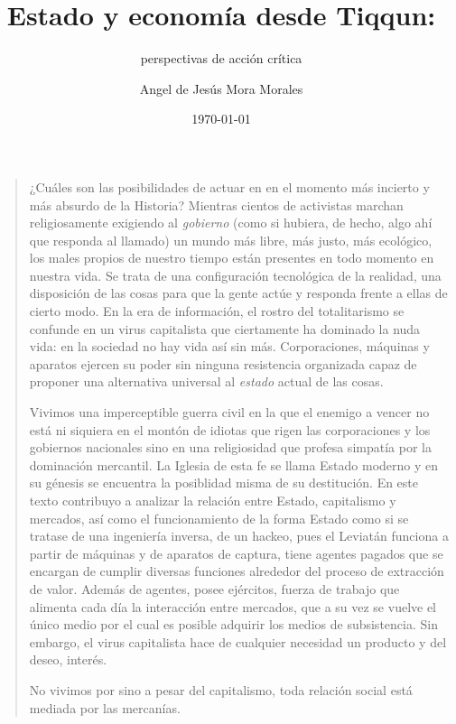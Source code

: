 \documentclass{scrbook}
\title{Estado y economía desde Tiqqun:}
\subtitle{perspectivas de acción crítica}
\author{Angel de Jesús Mora Morales}
\date{\today}
\begin{document}
\frontmatter
\maketitle


\begin{quotation}
    ¿Cuáles son las posibilidades de actuar en en el momento más incierto y más absurdo de la Historia? Mientras cientos de activistas marchan religiosamente exigiendo al \emph{gobierno} (como si hubiera, de hecho, algo ahí que responda al llamado) un mundo más libre, más justo, más ecológico, los males propios de nuestro tiempo están presentes en todo momento en nuestra vida. Se trata de una configuración tecnológica de la realidad, una disposición de las cosas para que la gente actúe y responda frente a ellas de cierto modo. En la era de información, el rostro del totalitarismo se confunde en un virus capitalista que ciertamente ha dominado la nuda vida: en la sociedad no hay vida así sin más. Corporaciones, máquinas y aparatos ejercen su poder sin ninguna resistencia organizada capaz de proponer una alternativa universal al \emph{estado} actual de las cosas.

    Vivimos una imperceptible guerra civil en la que el enemigo a vencer no está ni siquiera en el montón de idiotas que rigen las corporaciones y los gobiernos nacionales sino en una religiosidad que profesa simpatía por la dominación mercantil. La Iglesia de esta fe se llama Estado moderno y en su génesis se encuentra la posiblidad misma de su destitución. En este texto contribuyo a analizar la relación entre Estado, capitalismo y mercados, así como el funcionamiento de la forma Estado como si se tratase de una ingeniería inversa, de un hackeo, pues el Leviatán funciona a partir de máquinas y de aparatos de captura, tiene agentes pagados que se encargan de cumplir diversas funciones alrededor del proceso de extracción de valor. Además de agentes, posee ejércitos, fuerza de trabajo que alimenta cada día la interacción entre mercados, que a su vez se vuelve el único medio por el cual es posible adquirir los medios de subsistencia. Sin embargo, el virus capitalista hace de cualquier necesidad un producto y del deseo, interés. 

    No vivimos por sino a pesar del capitalismo, toda relación social está mediada por las mercanías. 


\end{quotation}
\end{document}
